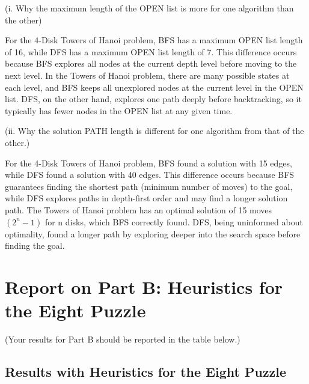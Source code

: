 \documentclass{article}
\begin{document}
\begin{paragraph}
(i. Why the maximum length of the OPEN list is more for one algorithm than the other)

For the 4-Disk Towers of Hanoi problem, BFS has a maximum OPEN list length of 16, while DFS has a maximum OPEN list length of 7. This difference occurs because BFS explores all nodes at the current depth level before moving to the next level. In the Towers of Hanoi problem, there are many possible states at each level, and BFS keeps all unexplored nodes at the current level in the OPEN list. DFS, on the other hand, explores one path deeply before backtracking, so it typically has fewer nodes in the OPEN list at any given time.

\end{paragraph}
\begin{paragraph}
(ii. Why the solution PATH length is different for one algorithm from that of the other.)

For the 4-Disk Towers of Hanoi problem, BFS found a solution with 15 edges, while DFS found a solution with 40 edges. This difference occurs because BFS guarantees finding the shortest path (minimum number of moves) to the goal, while DFS explores paths in depth-first order and may find a longer solution path. The Towers of Hanoi problem has an optimal solution of 15 moves $(2^n - 1)$ for n disks, which BFS correctly found. DFS, being uninformed about optimality, found a longer path by exploring deeper into the search space before finding the goal.

\end{paragraph}

\newpage
\section{Report on Part B: Heuristics for the Eight Puzzle}

(Your results for Part B should be reported in the table below.)


\subsection{Results with Heuristics for the Eight Puzzle}
\end{document}
